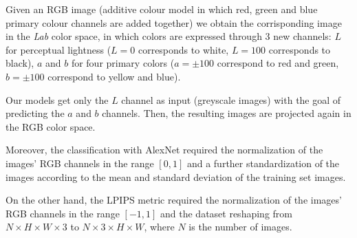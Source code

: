 Given an RGB image (additive colour model in which red, green and blue primary colour channels are added together) we obtain the corrisponding image in the \textit{Lab} color space, in which colors are expressed through 3 new channels: $L$ for perceptual lightness ($L=0$ corresponds to white, $L=100$ corresponds to black), $a$ and $b$ for four primary colors ($a=\pm100$ correspond to red and green, $b=\pm100$ correspond to yellow and blue).

Our models get only the $L$ channel as input (greyscale images) with the goal of predicting the $a$ and $b$ channels. Then, the resulting images are projected again in the RGB color space.

Moreover, the classification with AlexNet required the normalization of the images' RGB channels in the range $[0,1]$ and a further standardization of the images according to the mean and standard deviation of the training set images. 

On the other hand, the LPIPS metric required the normalization of the images' RGB channels in the range $[-1,1]$ and the dataset reshaping from $N\times H\times W\times3$ to $N\times3\times H\times W$, where $N$ is the number of images.